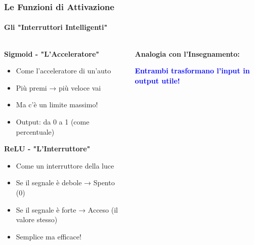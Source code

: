 \documentclass[aspectratio=169]{beamer}
\begin{document}
%
%
\begin{frame}
\frametitle{Le Funzioni di Attivazione}
\framesubtitle{Gli "Interruttori Intelligenti"}

\begin{columns}
\begin{column}{0.5\textwidth}
\textbf{Sigmoid - "L'Acceleratore"}
\begin{itemize}
    \item Come l'acceleratore di un'auto
    \item Più premi → più veloce vai
    \item Ma c'è un limite massimo!
    \item Output: da 0 a 1 (come percentuale)
\end{itemize}

\vspace{0.5cm}
\textbf{ReLU - "L'Interruttore"}
\begin{itemize}
    \item Come un interruttore della luce
    \item Se il segnale è debole → Spento (0)
    \item Se il segnale è forte → Acceso (il valore stesso)
    \item Semplice ma efficace!
\end{itemize}
\end{column}

\begin{column}{0.5\textwidth}
\begin{center}
\textbf{Analogia con l'Insegnamento:}

\vspace{0.3cm}

\vspace{0.5cm}
\textcolor{blue}{\textbf{Entrambi trasformano l'input in output utile!}}
\end{center}
\end{column}
\end{columns}

\end{frame}
%
\end{document}
